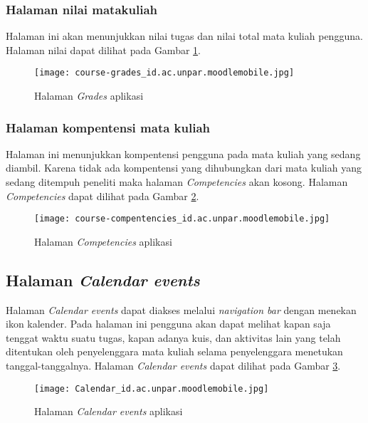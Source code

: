 \subsubsection{Halaman nilai matakuliah}
Halaman ini akan menunjukkan nilai tugas dan nilai total mata kuliah pengguna. Halaman nilai dapat dilihat pada Gambar \ref{app:grades}.

\begin{figure}[H] 
	\centering  
	\texttt{[image: course-grades\_id.ac.unpar.moodlemobile.jpg]}  
	\caption[Halaman \textit{Grades} aplikasi] {Halaman \textit{Grades} aplikasi} 
	\label{app:grades} 
\end{figure}  

\subsubsection{Halaman kompentensi mata kuliah}
Halaman ini menunjukkan kompentensi pengguna pada mata kuliah yang sedang diambil. Karena tidak ada kompentensi yang dihubungkan dari mata kuliah yang sedang ditempuh peneliti maka halaman \textit{Competencies} akan kosong. Halaman \textit{Competencies} dapat dilihat pada Gambar \ref{app:competencies}.

\begin{figure}[H] 
	\centering  
	\texttt{[image: course-compentencies\_id.ac.unpar.moodlemobile.jpg]}  
	\caption[Halaman \textit{Competencies} aplikasi] {Halaman \textit{Competencies} aplikasi} 
	\label{app:competencies} 
\end{figure}  

\subsection{Halaman \textit{Calendar events}}

Halaman \textit{Calendar events} dapat diakses melalui \textit{navigation bar} dengan menekan ikon kalender. Pada halaman ini pengguna akan dapat melihat kapan saja tenggat waktu suatu tugas, kapan adanya kuis, dan aktivitas lain yang telah ditentukan oleh penyelenggara mata kuliah selama penyelenggara menetukan tanggal-tanggalnya. Halaman \textit{Calendar events} dapat dilihat pada Gambar \ref{app:calendar}.

\begin{figure}[H] 
	\centering  
	\texttt{[image: Calendar\_id.ac.unpar.moodlemobile.jpg]}  
	\caption[Halaman \textit{Calendar events} aplikasi] {Halaman \textit{Calendar events} aplikasi} 
	\label{app:calendar} 
\end{figure}  


